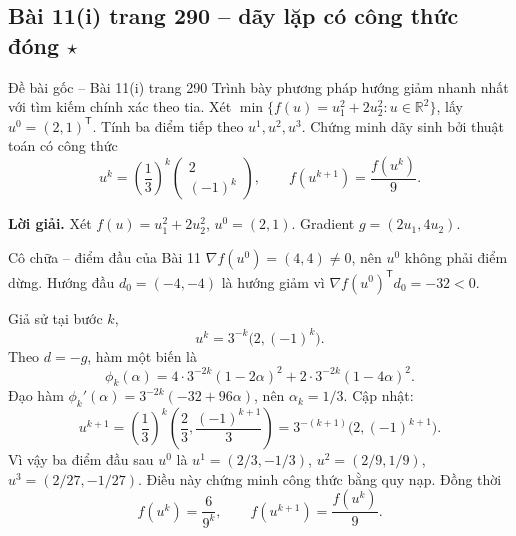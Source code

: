 \documentclass[11pt,a4paper]{article}
\newcommand{\R}{\mathbb{R}}
\newcommand{\grad}{\nabla}
\newcommand{\T}{^{\mathsf T}}
\begin{document}
\subsection{Bài 11(i) trang 290 -- dãy lặp có công thức đóng \(\star\)}
\begin{questionbox}{Đề bài gốc -- Bài 11(i) trang 290}
Trình bày phương pháp hướng giảm nhanh nhất với tìm kiếm chính xác theo tia. Xét \(\min\{f(u)=u_1^2+2u_2^2:u\in\R^2\}\), lấy \(u^0=(2,1)\T\). Tính ba điểm tiếp theo \(u^1,u^2,u^3\). Chứng minh dãy sinh bởi thuật toán có công thức
\[
u^k=\left(\frac13\right)^k\begin{pmatrix}2\\(-1)^k\end{pmatrix},\qquad f(u^{k+1})=\frac{f(u^k)}9.
\]
\end{questionbox}
\textbf{Lời giải.}
Xét \(f(u)=u_1^2+2u_2^2\), \(u^0=(2,1)\). Gradient \(g=(2u_1,4u_2)\).
\begin{answerbox}{Cô chữa -- điểm đầu của Bài 11}
\(\grad f(u^0)=(4,4)\ne0\), nên \(u^0\) không phải điểm dừng. Hướng đầu \(d_0=(-4,-4)\) là hướng giảm vì \(\grad f(u^0)\T d_0=-32<0\).
\end{answerbox}
Giả sử tại bước \(k\),
\[
u^k=3^{-k}\big(2,(-1)^k\big).
\]
Theo \(d=-g\), hàm một biến là
\[
\phi_k(\alpha)=4\cdot3^{-2k}(1-2\alpha)^2+
2\cdot3^{-2k}(1-4\alpha)^2.
\]
Đạo hàm \(\phi_k'(\alpha)=3^{-2k}(-32+96\alpha)\), nên \(\alpha_k=1/3\). Cập nhật:
\[
u^{k+1}=\left(\frac13\right)^k\left(\frac23,\frac{(-1)^{k+1}}3\right)
=3^{-(k+1)}\big(2,(-1)^{k+1}\big).
\]
Vì vậy ba điểm đầu sau \(u^0\) là \(u^1=(2/3,-1/3)\), \(u^2=(2/9,1/9)\), \(u^3=(2/27,-1/27)\).
Điều này chứng minh công thức bằng quy nạp. Đồng thời
\[
f(u^k)=\frac6{9^k},\qquad f(u^{k+1})=\frac{f(u^k)}9.
\]

\end{document}
